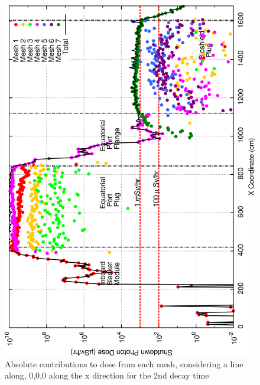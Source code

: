 \documentclass[12pt]{article}
\begin{document}
\begin{figure}[ht!]
\centering
\includegraphics[clip,scale=0.25]{../plots/crosstalk/nob4c/ep/dc2.png}
\caption{Absolute contributions to dose from each mesh, considering a line along, 0,0,0 along the x direction for the 2nd decay time}
\label{fig:ct_ep_dc2}
\end{figure}
\end{document}
